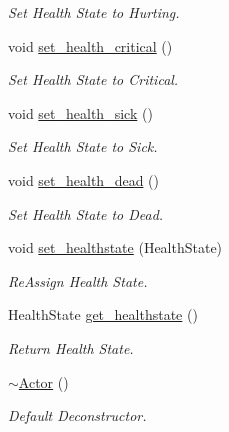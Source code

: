\begin{DoxyCompactItemize}
\begin{DoxyCompactList}\small\item\em Set Health State to Hurting. \end{DoxyCompactList}\item 
\mbox{\label{classActor_a8a9c36002bd9c16263f71998db342f43}} 
void \mbox{\hyperlink{classActor_a8a9c36002bd9c16263f71998db342f43}{set\+\_\+health\+\_\+critical}} ()
\begin{DoxyCompactList}\small\item\em Set Health State to Critical. \end{DoxyCompactList}\item 
\mbox{\label{classActor_aa50ea98f77ccff3d887942e5dbafcc5f}} 
void \mbox{\hyperlink{classActor_aa50ea98f77ccff3d887942e5dbafcc5f}{set\+\_\+health\+\_\+sick}} ()
\begin{DoxyCompactList}\small\item\em Set Health State to Sick. \end{DoxyCompactList}\item 
\mbox{\label{classActor_a1c070ef8e7e3e26a31180ad1553f0740}} 
void \mbox{\hyperlink{classActor_a1c070ef8e7e3e26a31180ad1553f0740}{set\+\_\+health\+\_\+dead}} ()
\begin{DoxyCompactList}\small\item\em Set Health State to Dead. \end{DoxyCompactList}\item 
\mbox{\label{classActor_a6cc3e20a87778ba62cfd5e2940fde6d0}} 
void \mbox{\hyperlink{classActor_a6cc3e20a87778ba62cfd5e2940fde6d0}{set\+\_\+healthstate}} (Health\+State)
\begin{DoxyCompactList}\small\item\em Re\+Assign Health State. \end{DoxyCompactList}\item 
Health\+State \mbox{\hyperlink{classActor_ab3db004321ad4d3ce4195b1e6173dbfb}{get\+\_\+healthstate}} ()
\begin{DoxyCompactList}\small\item\em Return Health State. \end{DoxyCompactList}\item 
\mbox{\label{classActor_ad807fe8f85e72ab263a0c05e3231cb39}} 
\mbox{\hyperlink{classActor_ad807fe8f85e72ab263a0c05e3231cb39}{$\sim$\+Actor}} ()
\begin{DoxyCompactList}\small\item\em Default Deconstructor. \end{DoxyCompactList}\end{DoxyCompactItemize}
